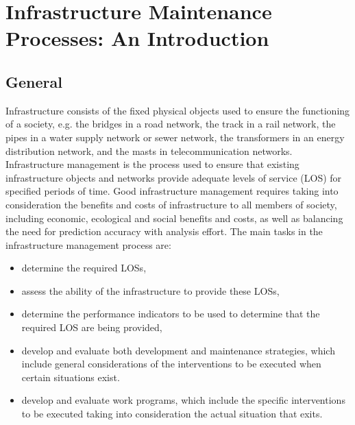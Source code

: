 %
%
%
\chapter{Infrastructure Maintenance Processes: An Introduction}
\label{intro} %

\section{General}
Infrastructure consists of the fixed physical objects used to ensure the functioning of a society, e.g. the bridges in a road network, the track in a rail network, the pipes in a water supply network or sewer network, the transformers in an energy distribution network, and the masts in telecommunication networks. Infrastructure management is the process used to ensure that existing infrastructure objects and networks provide adequate levels of service (LOS) for specified periods of time. Good infrastructure management requires taking into consideration the benefits and costs of infrastructure to all members of society, including economic, ecological and social benefits and costs, as well as balancing the need for prediction accuracy with analysis effort. The main tasks in the infrastructure management process are: 

\begin{itemize}
	\item determine the required LOSs,
	\item assess the ability of the infrastructure to provide these LOSs, 
	\item determine the performance indicators to be used to determine that the required LOS are being provided, 
	\item develop and evaluate both development and maintenance strategies, which include general considerations of the interventions to be executed when certain situations exist.
	\item develop and evaluate work programs, which include the specific interventions to be executed taking into consideration the actual situation that exits. 
\end{itemize}

